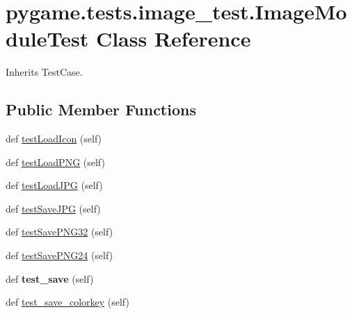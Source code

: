 \hypertarget{classpygame_1_1tests_1_1image__test_1_1_image_module_test}{}\section{pygame.\+tests.\+image\+\_\+test.\+Image\+Module\+Test Class Reference}
\label{classpygame_1_1tests_1_1image__test_1_1_image_module_test}


Inherits Test\+Case.

\subsection*{Public Member Functions}
\begin{DoxyCompactItemize}
\item 
def \hyperlink{classpygame_1_1tests_1_1image__test_1_1_image_module_test_a507c57494ae611851e4e9935a8afdcb8}{test\+Load\+Icon} (self)
\item 
def \hyperlink{classpygame_1_1tests_1_1image__test_1_1_image_module_test_a3ef21de80d9d38998385d6ecb25651a7}{test\+Load\+P\+NG} (self)
\item 
def \hyperlink{classpygame_1_1tests_1_1image__test_1_1_image_module_test_a3340ce79b2724e858efe4649378d15b4}{test\+Load\+J\+PG} (self)
\item 
def \hyperlink{classpygame_1_1tests_1_1image__test_1_1_image_module_test_a32b6b96b7293097621259284656e43f7}{test\+Save\+J\+PG} (self)
\item 
def \hyperlink{classpygame_1_1tests_1_1image__test_1_1_image_module_test_aee10acd60857be21a9a7afa78df13763}{test\+Save\+P\+N\+G32} (self)
\item 
def \hyperlink{classpygame_1_1tests_1_1image__test_1_1_image_module_test_a193957b3591236c9f669538af38af9da}{test\+Save\+P\+N\+G24} (self)
\item 
\mbox{\label{classpygame_1_1tests_1_1image__test_1_1_image_module_test_a9e59cd5057d54bf29925850d5c43d824}} 
def {\bfseries test\+\_\+save} (self)
\item 
def \hyperlink{classpygame_1_1tests_1_1image__test_1_1_image_module_test_aae48f59f73221a74e96ee5a145469ea3}{test\+\_\+save\+\_\+colorkey} (self)
\item 
\mbox{\label{classpygame_1_1tests_1_1image__test_1_1_image_module_test_a14289e82dd02167c70f8b44dac10e156}} 

\end{DoxyCompactItemize}
